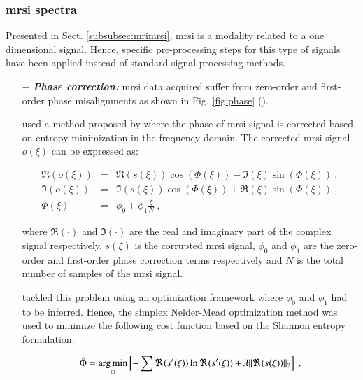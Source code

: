 \subsubsection{\ac{mrsi} spectra}

Presented in Sect. \ref{subsubsec:mrimrsi}, \ac{mrsi} is a modality related to a one dimensional signal. Hence, specific pre-processing steps for this type of signals have been applied instead of standard signal processing methods.

\begin{enumerate}[leftmargin=*]

	\item[$-$] \textbf{\textit{Phase correction:}} \ac{mrsi} data acquired suffer from zero-order and first-order phase misalignments as shown in Fig. \ref{fig:phase} (\cite{Chen2002,Osorio-Garcia2012}). 
	
\cite{Parfait2012} used a method proposed by \cite{Chen2002} where the phase of \ac{mrsi} signal is corrected based on entropy minimization in  the frequency domain. The corrected \ac{mrsi} signal $o(\xi)$ can be expressed as:

\begin{eqnarray}
	\Re(o(\xi)) & = & \Re(s(\xi))\cos(\Phi(\xi)) - \Im(\xi)\sin(\Phi(\xi)) \ , \nonumber  \\
	\Im(o(\xi)) & = & \Im(s(\xi))\cos(\Phi(\xi)) + \Re(\xi)\sin(\Phi(\xi)) \ , \nonumber \\
	\Phi(\xi) & = & \phi_0 + \phi_1 \frac{\xi}{N} \ , \label{eq:mrsiphcorr}
\end{eqnarray}

\noindent where $\Re(\cdot)$ and $\Im(\cdot)$ are the real and imaginary part of the complex signal respectively, $s(\xi)$ is the corrupted \ac{mrsi} signal, $\phi_0$ and $\phi_1$ are the zero-order and first-order phase correction terms respectively and $N$ is the total number of samples of the \ac{mrsi} signal.

\cite{Chen2002} tackled this problem using an optimization framework where $\phi_0$ and $\phi_1$ had to be inferred. Hence, the simplex Nelder-Mead optimization method was used to minimize the following cost function based on the Shannon entropy formulation:

\begin{equation}
	\hat{\Phi} = \argmin_{\Phi} \left[ - \sum \Re(s'(\xi)) \ln \Re(s'(\xi)) + \lambda \|\Re(s(\xi))\|_2 \right] \ ,
	\label{eq:phcost}
\end{equation}


\end{enumerate}
